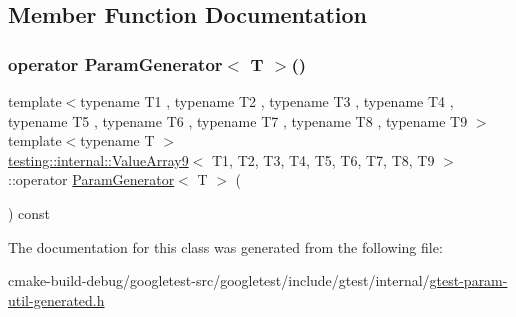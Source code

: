 \subsection{Member Function Documentation}
\mbox{\label{classtesting_1_1internal_1_1ValueArray9_aede7e5849cfab0504c49673d5c5c4cce}} 
\subsubsection{\texorpdfstring{operator ParamGenerator$<$ T $>$()}{operator ParamGenerator< T >()}}
{\footnotesize\ttfamily template$<$typename T1 , typename T2 , typename T3 , typename T4 , typename T5 , typename T6 , typename T7 , typename T8 , typename T9 $>$ \\
template$<$typename T $>$ \\
\mbox{\hyperlink{classtesting_1_1internal_1_1ValueArray9}{testing\+::internal\+::\+Value\+Array9}}$<$ T1, T2, T3, T4, T5, T6, T7, T8, T9 $>$\+::operator \mbox{\hyperlink{classtesting_1_1internal_1_1ParamGenerator}{Param\+Generator}}$<$ T $>$ (\begin{DoxyParamCaption}{ }\end{DoxyParamCaption}) const\hspace{0.3cm}{\ttfamily [inline]}}



The documentation for this class was generated from the following file\+:\begin{DoxyCompactItemize}
\item 
cmake-\/build-\/debug/googletest-\/src/googletest/include/gtest/internal/\mbox{\hyperlink{gtest-param-util-generated_8h}{gtest-\/param-\/util-\/generated.\+h}}\end{DoxyCompactItemize}
